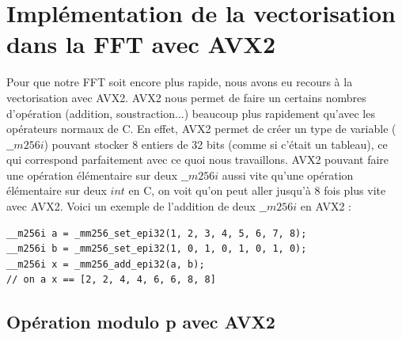 \documentclass[12pt, a4paper]{article}
\begin{document}
\section{Implémentation de la vectorisation dans la FFT avec AVX2}

Pour que notre FFT soit encore plus rapide, nous avons eu recours à la vectorisation avec AVX2. AVX2 nous permet de faire un certains nombres d'opération (addition, soustraction...) beaucoup plus rapidement qu'avec les opérateurs normaux de C. En effet, AVX2 permet de créer un type de variable ($\_\_m256i$) pouvant stocker 8 entiers de 32 bits (comme si c'était un tableau), ce qui correspond parfaitement avec ce quoi nous travaillons. AVX2 pouvant faire une opération élémentaire sur deux $\_\_m256i$ aussi vite qu'une opération élémentaire sur deux $int$ en C, on voit qu'on peut aller jusqu'à 8 fois plus vite avec AVX2. Voici un exemple de l'addition de deux $\_\_m256i$ en AVX2 : 

\begin{lstlisting}
__m256i a = _mm256_set_epi32(1, 2, 3, 4, 5, 6, 7, 8);
__m256i b = _mm256_set_epi32(1, 0, 1, 0, 1, 0, 1, 0);
__m256i x = _mm256_add_epi32(a, b);
// on a x == [2, 2, 4, 4, 6, 6, 8, 8]
\end{lstlisting}

\subsection{Opération modulo p avec AVX2}
\end{document}
